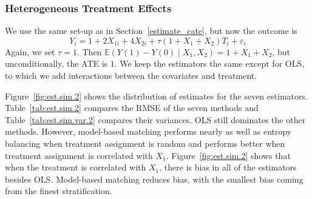 \documentclass[12pt]{article}
\newcommand{\ex}{\mathbb{E}} %
\newcommand{\eps}{\varepsilon}
\begin{document}
\subsubsection{Heterogeneous Treatment Effects}\label{estimate_het_ate}
We use the same set-up as in Section~\ref{estimate_cate}, but now the outcome is
$$Y_i = 1 + 2X_{1i} + 4X_{2i} + \tau(1 + X_1 + X_2)T_i + \eps_i$$
Again, we set $\tau=1$.
Then $\ex(Y(1) - Y(0) \mid X_1, X_2) = 1 + X_1 + X_2$, but unconditionally, the ATE is $1$.
We keep the estimators the same except for OLS, to which we add interactions between the covariates and treatment.

Figure~\ref{fig:est.sim.2} shows the distribution of estimates for the seven estimators.
Table~\ref{tab:est.sim.2} compares the RMSE of the seven methods and Table~\ref{tab:est.sim.var.2} compares their variances.
OLS still dominates the other methods.
However, model-based matching performs nearly as well as entropy balancing when treatment assignment is random and performs better when treatment assignment is correlated with $X_1$.
Figure~\ref{fig:est.sim.2} shows that when the treatment is correlated with $X_1$, there is bias in all of the estimators besides OLS.
Model-based matching reduces bias, with the smallest bias coming from the finest stratification.
\end{document}
